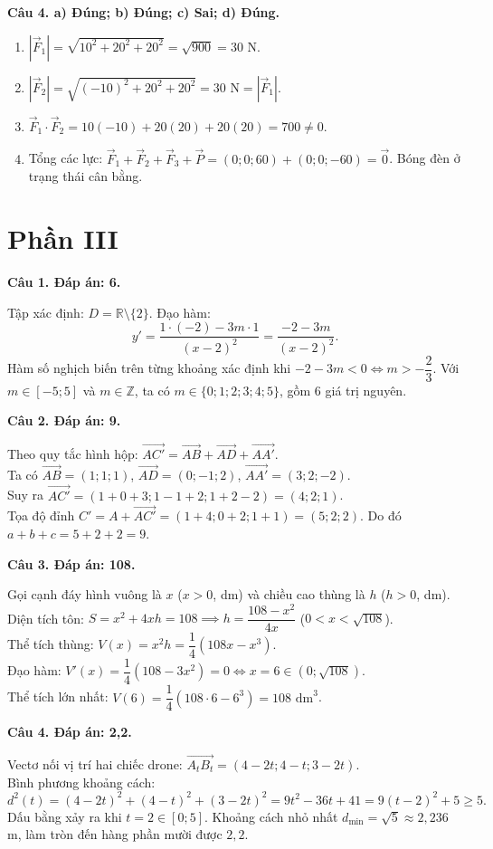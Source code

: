 \documentclass[12pt,a4paper]{article}
\newcommand{\loigiai}[1]{\par\medskip\Needspace{3\baselineskip}\noindent\textbf{#1}\par\nobreak}
\begin{document}
\loigiai{Câu 4. a) Đúng; b) Đúng; c) Sai; d) Đúng.}
\begin{enumerate}[label=\alph*),leftmargin=*,itemsep=2pt]
\item $|\vec F_1|=\sqrt{10^2+20^2+20^2}=\sqrt{900}=30$ N.
\item $|\vec F_2|=\sqrt{(-10)^2+20^2+20^2}=30\text{ N}=|\vec F_1|$.
\item $\vec F_1\cdot\vec F_2=10(-10)+20(20)+20(20)=700\ne0$.
\item Tổng các lực: $\vec F_1+\vec F_2+\vec F_3+\vec P=(0;0;60)+(0;0;-60)=\vec0$. Bóng đèn ở trạng thái cân bằng.
\end{enumerate}

\newpage
\section*{\large Phần III}
\loigiai{Câu 1. Đáp án: 6.}
Tập xác định: $D=\mathbb R\setminus\{2\}$. Đạo hàm:
\[
y'=\frac{1\cdot(-2)-3m\cdot1}{(x-2)^2}=\frac{-2-3m}{(x-2)^2}.
\]
Hàm số nghịch biến trên từng khoảng xác định khi $-2-3m<0\Leftrightarrow m>-\dfrac{2}{3}$.
Với $m\in[-5;5]$ và $m\in\mathbb Z$, ta có $m\in\{0;1;2;3;4;5\}$, gồm $6$ giá trị nguyên.

\loigiai{Câu 2. Đáp án: 9.}
Theo quy tắc hình hộp: $\overrightarrow{AC'}=\overrightarrow{AB}+\overrightarrow{AD}+\overrightarrow{AA'}$.\\
Ta có $\overrightarrow{AB}=(1;1;1)$, $\overrightarrow{AD}=(0;-1;2)$, $\overrightarrow{AA'}=(3;2;-2)$.\\
Suy ra $\overrightarrow{AC'}=(1+0+3;1-1+2;1+2-2)=(4;2;1)$.\\
Tọa độ đỉnh $C'=A+\overrightarrow{AC'}=(1+4;0+2;1+1)=(5;2;2)$. Do đó $a+b+c=5+2+2=9$.

\loigiai{Câu 3. Đáp án: 108.}
Gọi cạnh đáy hình vuông là $x$ ($x>0$, dm) và chiều cao thùng là $h$ ($h>0$, dm).\\
Diện tích tôn: $S=x^2+4xh=108\implies h=\dfrac{108-x^2}{4x}$ ($0<x<\sqrt{108}$).\\
Thể tích thùng: $V(x)=x^2 h=\dfrac{1}{4}(108x-x^3)$.\\
Đạo hàm: $V'(x)=\dfrac{1}{4}(108-3x^2)=0\Leftrightarrow x=6\in(0;\sqrt{108})$.\\
Thể tích lớn nhất: $V(6)=\dfrac{1}{4}(108\cdot6-6^3)=108\text{ dm}^3$.

\loigiai{Câu 4. Đáp án: 2,2.}
Vectơ nối vị trí hai chiếc drone: $\overrightarrow{A_t B_t}=(4-2t;4-t;3-2t)$.\\
Bình phương khoảng cách:
\[
d^2(t)=(4-2t)^2+(4-t)^2+(3-2t)^2=9t^2-36t+41=9(t-2)^2+5\ge5.
\]
Dấu bằng xảy ra khi $t=2\in[0;5]$. Khoảng cách nhỏ nhất $d_{\min}=\sqrt5\approx2{,}236$ m, làm tròn đến hàng phần mười được $2{,}2$.
\end{document}
